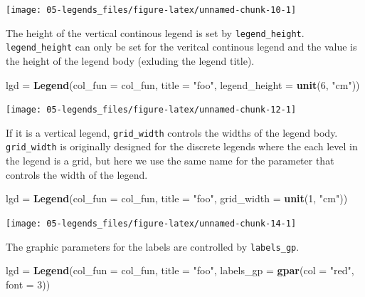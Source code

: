 \documentclass[]{book}
\newenvironment{Shaded}{\begin{snugshade}}{\end{snugshade}}
\newcommand{\KeywordTok}[1]{\textcolor[rgb]{0.13,0.29,0.53}{\textbf{#1}}}
\newcommand{\DataTypeTok}[1]{\textcolor[rgb]{0.13,0.29,0.53}{#1}}
\newcommand{\DecValTok}[1]{\textcolor[rgb]{0.00,0.00,0.81}{#1}}
\newcommand{\StringTok}[1]{\textcolor[rgb]{0.31,0.60,0.02}{#1}}
\newcommand{\NormalTok}[1]{#1}
\theoremstyle{definition}
\theoremstyle{definition}
\theoremstyle{definition}
\theoremstyle{remark}
\begin{document}
\begin{center}\texttt{[image: 05-legends\_files/figure-latex/unnamed-chunk-10-1]} \end{center}

The height of the vertical continous legend is set by
\texttt{legend\_height}. \texttt{legend\_height} can only be set for the
veritcal continous legend and the value is the height of the legend body
(exluding the legend title).

\begin{Shaded}
\begin{Highlighting}[]
\NormalTok{lgd =}\StringTok{ }\KeywordTok{Legend}\NormalTok{(}\DataTypeTok{col_fun =}\NormalTok{ col_fun, }\DataTypeTok{title =} \StringTok{"foo"}\NormalTok{, }\DataTypeTok{legend_height =} \KeywordTok{unit}\NormalTok{(}\DecValTok{6}\NormalTok{, }\StringTok{"cm"}\NormalTok{))}
\end{Highlighting}
\end{Shaded}

\begin{center}\texttt{[image: 05-legends\_files/figure-latex/unnamed-chunk-12-1]} \end{center}

If it is a vertical legend, \texttt{grid\_width} controls the widths of
the legend body. \texttt{grid\_width} is originally designed for the
discrete legends where the each level in the legend is a grid, but here
we use the same name for the parameter that controls the width of the
legend.

\begin{Shaded}
\begin{Highlighting}[]
\NormalTok{lgd =}\StringTok{ }\KeywordTok{Legend}\NormalTok{(}\DataTypeTok{col_fun =}\NormalTok{ col_fun, }\DataTypeTok{title =} \StringTok{"foo"}\NormalTok{, }\DataTypeTok{grid_width =} \KeywordTok{unit}\NormalTok{(}\DecValTok{1}\NormalTok{, }\StringTok{"cm"}\NormalTok{))}
\end{Highlighting}
\end{Shaded}

\begin{center}\texttt{[image: 05-legends\_files/figure-latex/unnamed-chunk-14-1]} \end{center}

The graphic parameters for the labels are controlled by
\texttt{labels\_gp}.

\begin{Shaded}
\begin{Highlighting}[]
\NormalTok{lgd =}\StringTok{ }\KeywordTok{Legend}\NormalTok{(}\DataTypeTok{col_fun =}\NormalTok{ col_fun, }\DataTypeTok{title =} \StringTok{"foo"}\NormalTok{, }\DataTypeTok{labels_gp =} \KeywordTok{gpar}\NormalTok{(}\DataTypeTok{col =} \StringTok{"red"}\NormalTok{, }\DataTypeTok{font =} \DecValTok{3}\NormalTok{))}
\end{Highlighting}
\end{Shaded}
\end{document}
